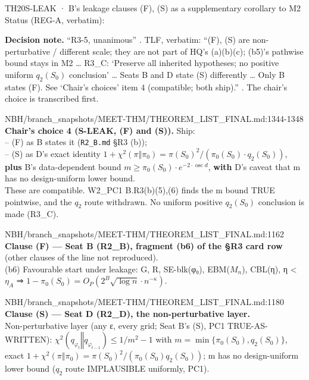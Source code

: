 \begin{card}{TH20}{S-LEAK · B's leakage clauses (F), (S) as a supplementary corollary to M2}
\approvedFB\quad Status (REG-A, verbatim):  

\textbf{Decision note.} ``R3-5, unanimous'' . TLF, verbatim: ``(F), (S) are non-perturbative / different scale; they are not part of HQ's (a)(b)(c); (b5)'s pathwise bound stays in M2 \ldots{} R3\_C: `Preserve all inherited hypotheses; no positive uniform $q_2(S_0)$ conclusion' \ldots{} Seats B and D state (S) differently \ldots{} Only B states (F). See `Chair's choices' item 4 (compatible; both ship).'' . The chair's choice is transcribed first.

\begin{stmt}{NBH/branch_snapshots/MEET-THM/THEOREM_LIST_FINAL.md:1344-1348}
\textbf{Chair's choice 4 (S-LEAK, (F) and (S)).} Ship:\\
– (F) as B states it (\texttt{R2\_B.md} §R3 (b));\\
– (S) as D's exact identity $1 + χ^2(π‖π_0) = π(S_0)^2 / (π_0(S_0)\cdot q_2(S_0))$, \textbf{plus} B's data-dependent bound $m ≥ π_0(S_0)\cdot e^{−2\cdot\operatorname{osc} d}$, \textbf{with} D's caveat that m has no design-uniform lower bound.\\
These are compatible. W2\_PC1 B.R3(b)(5),(6) finds the m bound TRUE pointwise, and the $q_2$ route withdrawn. No uniform positive $q_2(S_0)$ conclusion is made (R3\_C).
\end{stmt}

\begin{stmt}{NBH/branch_snapshots/MEET-THM/THEOREM_LIST_FINAL.md:1162}
\textbf{Clause (F) — Seat B (R2\_B), fragment (b6) of the §R3 card row} (other clauses of the line not reproduced).\\
(b6) Favourable start under leakage: G, R, SE-blk(φ₀), EBM($M_n$), CBL(η), η < $η_A$ ⇒ $1 − π_0(S_0) = O_P(2^B\sqrt{\log n}\cdot n^{−κ})$.
\end{stmt}

\begin{stmt}{NBH/branch_snapshots/MEET-THM/THEOREM_LIST_FINAL.md:1180}
\textbf{Clause (S) — Seat D (R2\_D), the non-perturbative layer.}\\
Non-perturbative layer (any ε, every grid; Seat B's (S), PC1 TRUE-AS-WRITTEN): $χ^2(q_{φ_t}‖q_{φ_{t−1}}) ≤ 1/m^2 − 1$ with $m = \min\{π_0(S_0), q_2(S_0)\}$, exact $1 + χ^2(π‖π_0) = π(S_0)^2/(π_0(S_0)q_2(S_0))$; m has no design-uniform lower bound ($q_2$ route IMPLAUSIBLE uniformly, PC1).
\end{stmt}


\end{card}
